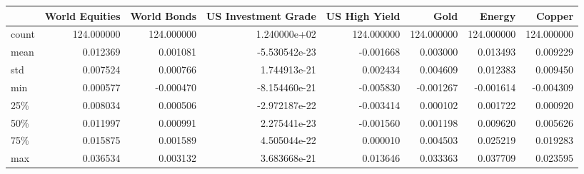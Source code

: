 \begin{tabular}{lrrrrrrr}
\toprule
{} &  World Equities &  World Bonds &  US Investment Grade &  US High Yield &        Gold &      Energy &      Copper \\
\midrule
count &      124.000000 &   124.000000 &         1.240000e+02 &     124.000000 &  124.000000 &  124.000000 &  124.000000 \\
mean  &        0.012369 &     0.001081 &        -5.530542e-23 &      -0.001668 &    0.003000 &    0.013493 &    0.009229 \\
std   &        0.007524 &     0.000766 &         1.744913e-21 &       0.002434 &    0.004609 &    0.012383 &    0.009450 \\
min   &        0.000577 &    -0.000470 &        -8.154460e-21 &      -0.005830 &   -0.001267 &   -0.001614 &   -0.004309 \\
25\%   &        0.008034 &     0.000506 &        -2.972187e-22 &      -0.003414 &    0.000102 &    0.001722 &    0.000920 \\
50\%   &        0.011997 &     0.000991 &         2.275441e-23 &      -0.001560 &    0.001198 &    0.009620 &    0.005626 \\
75\%   &        0.015875 &     0.001589 &         4.505044e-22 &       0.000010 &    0.004503 &    0.025219 &    0.019283 \\
max   &        0.036534 &     0.003132 &         3.683668e-21 &       0.013646 &    0.033363 &    0.037709 &    0.023595 \\
\bottomrule
\end{tabular}
